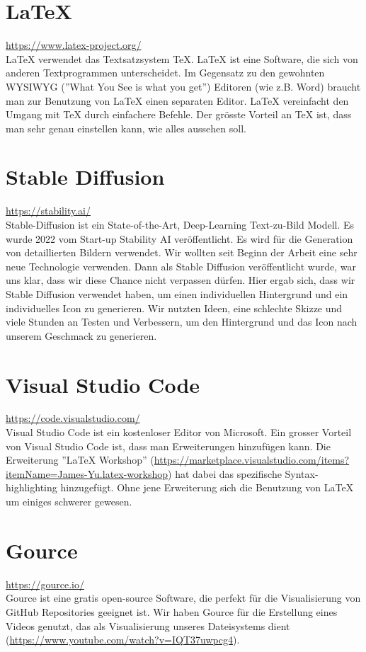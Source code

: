 \section{LaTeX}
\url{https://www.latex-project.org/}\\
LaTeX verwendet das Textsatzsystem TeX. LaTeX ist eine Software, die sich von anderen Textprogrammen unterscheidet. Im Gegensatz zu den gewohnten WYSIWYG (''What You See is what you get'') Editoren (wie z.B. Word)
braucht man zur Benutzung von LaTeX einen separaten Editor. LaTeX vereinfacht den Umgang mit TeX durch einfachere Befehle. Der grösste Vorteil an TeX ist, dass man sehr genau einstellen kann, wie alles aussehen soll.


\section{Stable Diffusion}
\url{https://stability.ai/}\\
Stable-Diffusion ist ein State-of-the-Art, Deep-Learning Text-zu-Bild Modell. Es wurde 2022 vom Start-up Stability AI veröffentlicht. Es wird für die Generation von detaillierten Bildern verwendet. Wir wollten seit
Beginn der Arbeit eine sehr neue Technologie verwenden. Dann als Stable Diffusion veröffentlicht wurde, war uns klar, dass wir diese Chance nicht verpassen dürfen. Hier ergab sich, dass wir Stable Diffusion verwendet haben, um einen individuellen
Hintergrund und ein individuelles Icon zu generieren. Wir nutzten Ideen, eine schlechte Skizze und viele Stunden an Testen und Verbessern, um den Hintergrund und das Icon nach unserem Geschmack zu generieren.

\section{Visual Studio Code}
\url{https://code.visualstudio.com/}\\
Visual Studio Code ist ein kostenloser Editor von Microsoft. Ein grosser Vorteil von Visual Studio Code ist, dass man Erweiterungen hinzufügen kann. Die Erweiterung ''LaTeX Workshop'' (\url{https://marketplace.visualstudio.com/items?itemName=James-Yu.latex-workshop})
hat dabei das spezifische Syntax-highlighting hinzugefügt. Ohne jene Erweiterung sich die Benutzung von LaTeX um einiges schwerer gewesen.

\section{Gource}
\url{https://gource.io/}\\
Gource ist eine gratis open-source Software, die perfekt für die Visualisierung von GitHub Repositories geeignet ist. Wir haben Gource für die Erstellung eines Videos genutzt, das als Visualisierung unseres Dateisystems
dient (\url{https://www.youtube.com/watch?v=IQT37uwpcg4}).

